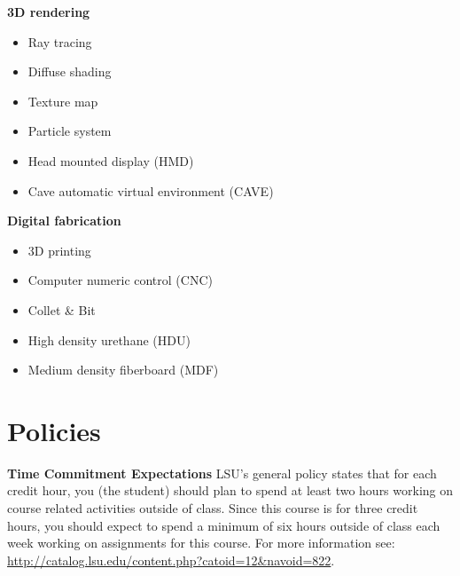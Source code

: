 \documentclass[11pt,article,oneside]{memoir}
\begin{document}
\begin{multicols}{2}
\textbf{3D rendering}
\begin{itemize}
\item Ray tracing
\item Diffuse shading
\item Texture map
\item Particle system
\item Head mounted display (HMD)
\item Cave automatic virtual environment (CAVE)
\end{itemize}

\textbf{Digital fabrication}
\begin{itemize}
\item 3D printing
\item Computer numeric control (CNC)
\item Collet \& Bit
\item High density urethane (HDU)
\item Medium density fiberboard (MDF)
\end{itemize}

%
\end{multicols}

\clearpage

\section{Policies}

\noindent \textbf{Time Commitment Expectations}
LSU's general policy states that for each credit hour, you (the student) should plan to
spend at least two hours working on course related activities outside of class. Since this course is for three credit hours, you should expect to spend a minimum of six hours outside of class each week working on assignments for this course. For more information see: 
\url{http://catalog.lsu.edu/content.php?catoid=12&navoid=822}.\\
\end{document}
